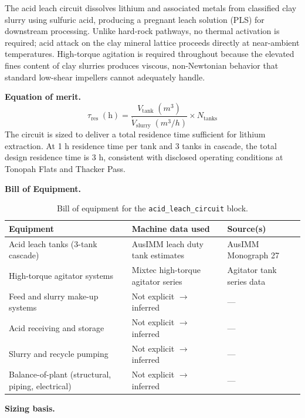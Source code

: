 The acid leach circuit dissolves lithium and associated metals from classified clay slurry using sulfuric acid, producing a pregnant leach solution (PLS) for downstream processing. Unlike hard-rock pathways, no thermal activation is required; acid attack on the clay mineral lattice proceeds directly at near-ambient temperatures. High-torque agitation is required throughout because the elevated fines content of clay slurries produces viscous, non-Newtonian behavior that standard low-shear impellers cannot adequately handle.

\medskip
\noindent\textbf{Equation of merit.}\quad
\[
    \tau_\text{res}\;(\text{h}) = \frac{V_\text{tank}\;(\si{m^3})}{\dot{V}_\text{slurry}\;(\si{m^3/h})} \times N_\text{tanks}
\]
The circuit is sized to deliver a total residence time sufficient for lithium extraction. At 1 h residence time per tank and 3 tanks in cascade, the total design residence time is 3 h, consistent with disclosed operating conditions at Tonopah Flats and Thacker Pass.

\medskip
\noindent\textbf{Bill of Equipment.}\quad

\begin{table}[h!]
\caption{Bill of equipment for the \texttt{acid\_leach\_circuit} block.}
\centering
\begin{tabular}{>{\raggedright\arraybackslash}p{5.2cm}
                >{\raggedright\arraybackslash}p{4cm}
                >{\raggedright\arraybackslash}p{4.5cm}}
\toprule
\textbf{Equipment} & \textbf{Machine data used} & \textbf{Source(s)} \\
\midrule
Acid leach tanks (3-tank cascade) & AusIMM leach duty tank estimates & AusIMM Monograph 27 \\
High-torque agitator systems & Mixtec high-torque agitator series & Agitator tank series data \\
Feed and slurry make-up systems & Not explicit $\rightarrow$ inferred & --- \\
Acid receiving and storage & Not explicit $\rightarrow$ inferred & --- \\
Slurry and recycle pumping & Not explicit $\rightarrow$ inferred & --- \\
Balance-of-plant (structural, piping, electrical) & Not explicit $\rightarrow$ inferred & --- \\
\bottomrule
\end{tabular}
\end{table}

\medskip
\noindent\textbf{Sizing basis.}\quad

